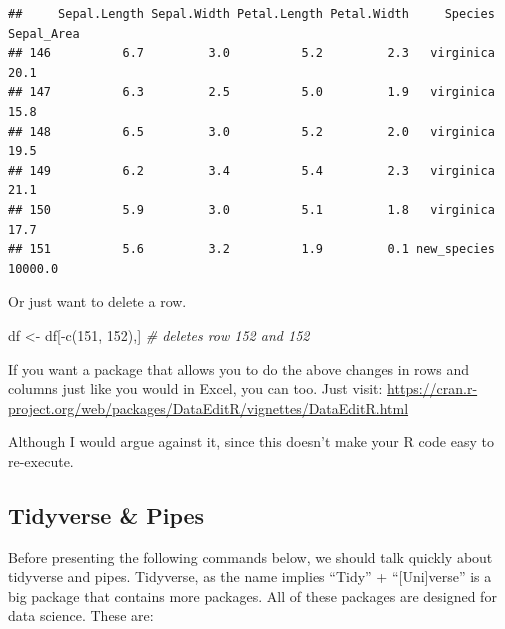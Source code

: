 \documentclass[
]{book}
\newenvironment{Shaded}{\begin{snugshade}}{\end{snugshade}}
\newcommand{\CommentTok}[1]{\textcolor[rgb]{0.56,0.35,0.01}{\textit{#1}}}
\newcommand{\DecValTok}[1]{\textcolor[rgb]{0.00,0.00,0.81}{#1}}
\newcommand{\FunctionTok}[1]{\textcolor[rgb]{0.00,0.00,0.00}{#1}}
\newcommand{\NormalTok}[1]{#1}
\newcommand{\OtherTok}[1]{\textcolor[rgb]{0.56,0.35,0.01}{#1}}
\newcommand{\SpecialCharTok}[1]{\textcolor[rgb]{0.00,0.00,0.00}{#1}}
\begin{document}
\begin{verbatim}
##     Sepal.Length Sepal.Width Petal.Length Petal.Width     Species Sepal_Area
## 146          6.7         3.0          5.2         2.3   virginica       20.1
## 147          6.3         2.5          5.0         1.9   virginica       15.8
## 148          6.5         3.0          5.2         2.0   virginica       19.5
## 149          6.2         3.4          5.4         2.3   virginica       21.1
## 150          5.9         3.0          5.1         1.8   virginica       17.7
## 151          5.6         3.2          1.9         0.1 new_species    10000.0
\end{verbatim}

Or just want to delete a row.

\begin{Shaded}
\begin{Highlighting}[]
\NormalTok{df }\OtherTok{\textless{}{-}}\NormalTok{ df[}\SpecialCharTok{{-}}\FunctionTok{c}\NormalTok{(}\DecValTok{151}\NormalTok{, }\DecValTok{152}\NormalTok{),]  }\CommentTok{\# deletes row 152 and 152}
\end{Highlighting}
\end{Shaded}

If you want a package that allows you to do the above changes in rows and columns just like you would in Excel, you can too.
Just visit: \url{https://cran.r-project.org/web/packages/DataEditR/vignettes/DataEditR.html}

Although I would argue against it, since this doesn't make your R code easy to re-execute.

\hypertarget{tidyverse-pipes}{%
\subsection{Tidyverse \& Pipes}\label{tidyverse-pipes}}

Before presenting the following commands below, we should talk quickly about tidyverse and pipes.
Tidyverse, as the name implies ``Tidy'' + ``{[}Uni{]}verse'' is a big package that contains more packages.
All of these packages are designed for data science.
These are:
\end{document}
